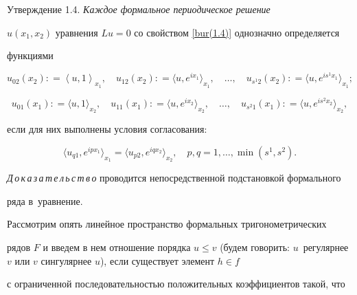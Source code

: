 \smallskip



{\small\sc Утверждение  1.4.} \it Каждое формальное периодическое решение

$u (x_1, x_2)$ уравнения $L u = 0$ со свойством \eqref{bur(1.4)} однозначно определяется

функциями

$$

u_{0 2} (x_2) : = \left <u, 1 \right>_{x_1}, \quad  

u_{12} (x_2) : = \langle u, e^{i x_1} \rangle_{x_1}, \quad \dots,

\quad 

u_{s^1 2} (x_2) : =  \langle u, e^{i s^1 x_1} \rangle _{x_1};

$$

$$

u_{01} (x_1) : = \langle u, 1 \rangle_{x_2}, \quad  

u_{11} (x_1) : = \langle u, e^{i x_2} \rangle_{x_2}, \quad \dots, \quad 

u_{s^2 1} (x_1) : = \langle u, e^{i s^2 x_2} \rangle_{x_2},

$$

если для них выполнены условия согласования{\rm\/:}

$$

\langle u_{q 1}, e^{i p x_1} \rangle _{x_1} = \langle u_{p 2}, e^{i q x_2} \rangle_{x_2},

\quad p, q = 1, \dots, \min (s^1, s^2).

$$



\rm





\smallskip





{\it  Д\,о\,к\,а\,з\,а\,т\,е\,л\,ь\,с\,т\,в\,о\/}  проводится непосредственной  подстановкой  формального

ряда в~уравнение.



\smallskip



Рассмотрим опять линейное пространство формальных тригонометрических

рядов $F$ и введем в нем отношение порядка $u \le v$ (будем говорить: $u$~регулярнее $v$ или $v$ сингулярнее $u$), если существует элемент $h \in f$

с ограниченной последовательностью положительных коэффициентов такой, что

